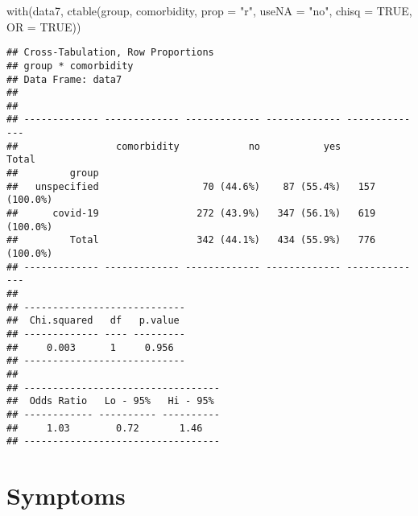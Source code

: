 \documentclass[
]{article}
\newenvironment{Shaded}{\begin{snugshade}}{\end{snugshade}}
\newcommand{\AttributeTok}[1]{\textcolor[rgb]{0.77,0.63,0.00}{#1}}
\newcommand{\ConstantTok}[1]{\textcolor[rgb]{0.00,0.00,0.00}{#1}}
\newcommand{\FunctionTok}[1]{\textcolor[rgb]{0.00,0.00,0.00}{#1}}
\newcommand{\NormalTok}[1]{#1}
\newcommand{\StringTok}[1]{\textcolor[rgb]{0.31,0.60,0.02}{#1}}
\begin{document}
\begin{Shaded}
\begin{Highlighting}[]
\FunctionTok{with}\NormalTok{(data7, }\FunctionTok{ctable}\NormalTok{(group, comorbidity, }\AttributeTok{prop =} \StringTok{"r"}\NormalTok{, }\AttributeTok{useNA =} \StringTok{"no"}\NormalTok{, }\AttributeTok{chisq =} \ConstantTok{TRUE}\NormalTok{, }\AttributeTok{OR =} \ConstantTok{TRUE}\NormalTok{))}
\end{Highlighting}
\end{Shaded}

\begin{verbatim}
## Cross-Tabulation, Row Proportions  
## group * comorbidity  
## Data Frame: data7  
## 
## 
## ------------- ------------- ------------- ------------- --------------
##                 comorbidity            no           yes          Total
##         group                                                         
##   unspecified                  70 (44.6%)    87 (55.4%)   157 (100.0%)
##      covid-19                 272 (43.9%)   347 (56.1%)   619 (100.0%)
##         Total                 342 (44.1%)   434 (55.9%)   776 (100.0%)
## ------------- ------------- ------------- ------------- --------------
## 
## ----------------------------
##  Chi.squared   df   p.value 
## ------------- ---- ---------
##     0.003      1     0.956  
## ----------------------------
## 
## ----------------------------------
##  Odds Ratio   Lo - 95%   Hi - 95% 
## ------------ ---------- ----------
##     1.03        0.72       1.46   
## ----------------------------------
\end{verbatim}

\hypertarget{symptoms}{%
\section{Symptoms}\label{symptoms}}
\end{document}

